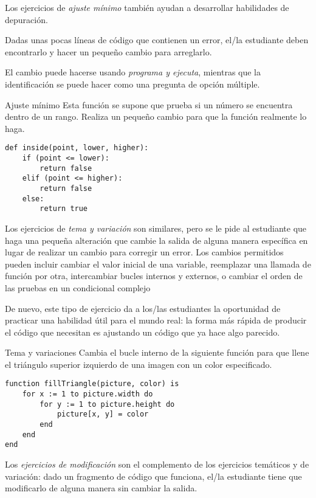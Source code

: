 Los ejercicios de \emph{ajuste mínimo} también ayudan a desarrollar habilidades de depuración.

Dadas unas pocas líneas de código que contienen un error, el/la estudiante deben encontrarlo y hacer un pequeño cambio para arreglarlo.

El cambio puede hacerse usando \emph{programa y ejecuta},
mientras que la identificación se puede hacer como una pregunta de opción múltiple.


\begin{aside}{Ajuste mínimo}
 Esta función se supone que prueba 
 si un número se encuentra dentro de un rango.
 Realiza un pequeño cambio para que la función realmente lo haga.

\begin{verbatim}
def inside(point, lower, higher):
    if (point <= lower):
        return false
    elif (point <= higher):
        return false
    else:
        return true
\end{verbatim}
\end{aside}

Los ejercicios de \emph{tema y variación} son similares, 
pero se le pide al estudiante que haga una pequeña alteración que cambie la salida de alguna manera específica 
en lugar de realizar un cambio para corregir un error.
Los cambios permitidos pueden incluir cambiar el valor inicial de una variable, 
reemplazar una llamada de función por otra, 
intercambiar bucles internos y externos,
o cambiar el orden de las pruebas en un condicional complejo

De nuevo,
este tipo de ejercicio da a los/las estudiantes la oportunidad de practicar una habilidad útil para el mundo real:
la forma más rápida de producir el código que necesitan 
es ajustando un código que ya hace algo parecido.

\begin{aside}{Tema y variaciones}
  Cambia el bucle interno de la siguiente 
  función para que llene el triángulo superior izquierdo de una imagen
  con un color especificado.

\begin{verbatim}
function fillTriangle(picture, color) is
    for x := 1 to picture.width do
        for y := 1 to picture.height do
            picture[x, y] = color
        end
    end
end
\end{verbatim}
\end{aside}

Los \emph{ejercicios de modificación} son el complemento de los ejercicios temáticos y de variación: 
dado un fragmento de código que funciona, el/la estudiante tiene que modificarlo de alguna manera sin cambiar la salida.

